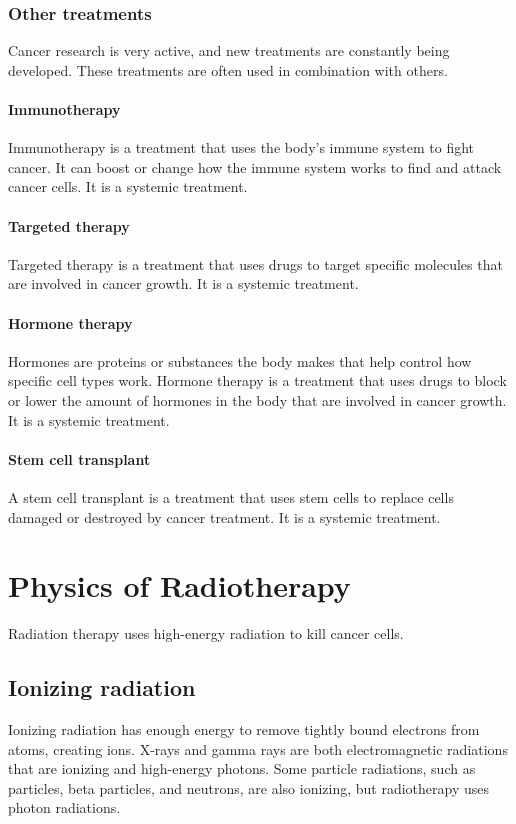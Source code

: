\subsubsection{Other treatments}
Cancer research is very active, and new treatments are constantly being developed.
These treatments are often used in combination with others.

\paragraph{Immunotherapy}
Immunotherapy is a treatment that uses the body's immune system to fight cancer.
It can boost or change how the immune system works to find and attack cancer cells.
It is a systemic treatment.

\paragraph{Targeted therapy}
Targeted therapy is a treatment that uses drugs to target specific molecules that are involved in cancer growth.
It is a systemic treatment.

\paragraph{Hormone therapy}
Hormones are proteins or substances the body makes that help control how specific cell types work.
Hormone therapy is a treatment that uses drugs to block or lower the amount of hormones in the body that are involved in cancer growth.
It is a systemic treatment.

\paragraph{Stem cell transplant}
A stem cell transplant is a treatment that uses stem cells to replace cells damaged or destroyed by cancer treatment.
It is a systemic treatment.



\section{Physics of Radiotherapy}
Radiation therapy uses high-energy radiation to kill cancer cells.

\subsection{Ionizing radiation}
Ionizing radiation has enough energy to remove tightly bound electrons from atoms, creating ions.
X-rays and gamma rays are both electromagnetic radiations that are ionizing and high-energy photons.
Some particle radiations, such as particles, beta particles, and neutrons, are also ionizing, but radiotherapy uses photon radiations.

